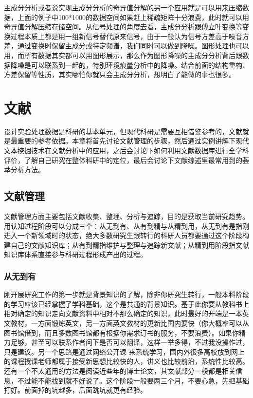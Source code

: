 \documentclass[]{tufte-book}
\begin{document}
主成分分析或者说实现主成分分析的奇异值分解的另一个应用就是可以用来压缩数据，上面的例子中100*1000的数据空间如果赶上稀疏矩阵十分浪费，此时就可以用奇异值分解压缩存储空间。从信号处理的角度去看，主成分分析跟傅立叶变换等变换过程本质上都是用一组新信号替代原来信号，由于一般认为信号方差高于噪音方差，通过变换时保留主成分或特定频谱，我们同时可以做到降噪。图形处理也可以用，而所有数据其实都可以用图形展示，那么作为图形降噪的主成分分析背后跟数据降噪是可以联系到一起的，特别环境痕量分析中的降噪。结合前面的结构重构、方差保留等性质，其实哪怕你就只会主成分分析，想明白了能做的事也很多。

\hypertarget{lib}{%
\chapter{文献}\label{lib}}

设计实验处理数据是科研的基本单元，但现代科研是需要互相借鉴参考的，文献就是最重要的参考依据。本章将首先讨论文献管理的步骤，然后通过实例讲解下现代文本挖掘技术在文献分析中的应用，之后会讨论下如何利用文献数据库进行全学科评价，了解自己研究在整体科研中的定位，最后会讨论下文献综述里最常用到的荟萃分析方法。

\hypertarget{ux6587ux732eux7ba1ux7406}{%
\section{文献管理}\label{ux6587ux732eux7ba1ux7406}}

文献管理方面主要包括文献收集、整理、分析与追踪，目的是获取当前研究趋势。用认知过程阶段可以分成三个：从无到有、从有到精与从精到用，从无到有是指刚进入一个新领域时的状态，绝大多数研究生跟转行的科研人员都要通过这个阶段构建自己的文献知识库；从有到精指维护与整理与追踪新文献；从精到用阶段指文献知识库体系直接参与科研过程形成产出的过程。

\hypertarget{ux4eceux65e0ux5230ux6709}{%
\subsection{从无到有}\label{ux4eceux65e0ux5230ux6709}}

刚开展研究工作的第一步就是背景知识的了解，除非你研究生转行，一般本科阶段的学习应该已经掌握了学科基础，这个是共通的背景知识。基于此你要从教科书上相对确定的知识走向文献资料中相对不那么确定的知识，此时最好的开端是一本英文教材，一方面锻炼英文，另一方面英文教材的更新比国内要快（你大概率可以从图书馆借到，而且多数图书馆都有根据你需求订书的服务，不要浪费）。如果你精力足够，甚至可以联系作者问下是否可以翻译，这样一举多得，不过我没操作过，只是建议。另一个思路是通过网络公开课 来系统学习，国内外很多高校放到网上的课程授课老师都属于接受新思想比较快的人，讲义也比较前沿，系统性比较高。还有一个不太通用的方法是阅读近些年的博士论文，其文献部分一般都是相关信息，不过能不能找到就不好说了。这个阶段一般要两三个月，不要心急，先把基础打好。前面掉的坑越多，后面跳坑就更有经验。
\end{document}
